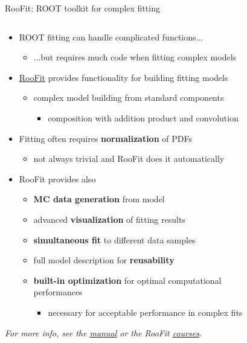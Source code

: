 \documentclass[aspectratio=169]{beamer}
\newcommand{\myfigure}[2]{
    \begin{figure}
        \makebox[\textwidth]{%
            \texttt{[image: \#2]}
        }
    \end{figure}
}
\newcommand{\myhref}[2]{{\color{blue}\href{#1}{\underline{#2}}}}
\begin{document}
\begin{frame}{RooFit: ROOT toolkit for complex fitting}
\begin{columns}
\begin{column}{0.7\textwidth}
    \begin{itemize}
        \item ROOT fitting can handle complicated functions...
        \begin{itemize}
            \item ...but requires much code when fitting complex models
        \end{itemize}
    \item \myhref{https://root.cern/manual/roofit/}{RooFit} provides functionality for building fitting models
        \begin{itemize}
            \item complex model building from standard components
        \begin{itemize}
            \item composition with addition product and convolution
        \end{itemize}
        \end{itemize}
        \item Fitting often requires \textbf{normalization} of PDFs
        \begin{itemize}
            \item not always trivial and RooFit does it automatically
        \end{itemize}
        \item RooFit provides also
        \begin{itemize}
            \item \textbf{MC data generation} from model
            \item advanced \textbf{visualization} of fitting results
            \item \textbf{simultaneous fit} to different data samples
            \item full model description for \textbf{reusability}
            \item \textbf{built-in optimization} for optimal computational performances
            \begin{itemize}
                \item necessary for acceptable performance in complex fits
            \end{itemize}
        \end{itemize}
    \end{itemize}
    {\small \textit{For more info, see the \myhref{https://root.cern/topical/\#roofit}{manual} or the RooFit \myhref{https://root.cern/get_started/courses/\#roofitroostats-tutorials}{courses}}}.
\end{column}
\begin{column}{0.3\textwidth}
    \myfigure{1.25}{figure-008.pdf}
\end{column}
\end{columns}
\end{frame}
\end{document}

